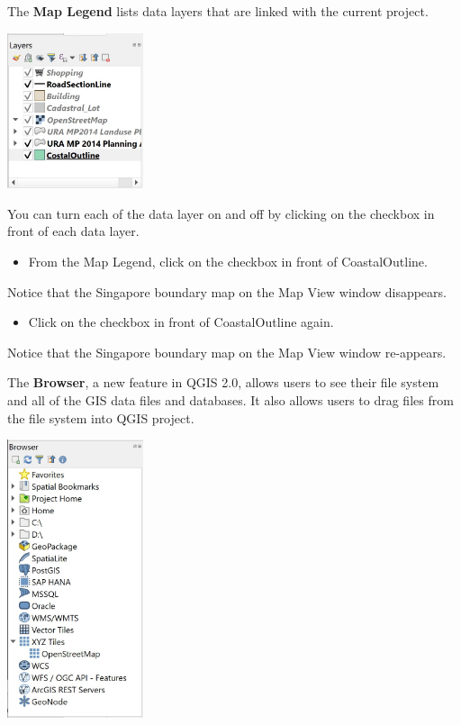 \documentclass[
  letterpaper,
  DIV=11,
  numbers=noendperiod]{scrreprt}
\providecommand{\tightlist}{%
  \setlength{\itemsep}{0pt}\setlength{\parskip}{0pt}}\usepackage{longtable,booktabs,array}
\begin{document}
The \textbf{Map Legend} lists data layers that are linked with the
current project.

\includegraphics[width=0.3\textwidth,height=\textheight]{./img/image1-10.jpg}

You can turn each of the data layer on and off by clicking on the
checkbox in front of each data layer.

\begin{itemize}
\tightlist
\item
  From the Map Legend, click on the checkbox in front of CoastalOutline.
\end{itemize}

Notice that the Singapore boundary map on the Map View window
disappears.

\begin{itemize}
\tightlist
\item
  Click on the checkbox in front of CoastalOutline again.
\end{itemize}

Notice that the Singapore boundary map on the Map View window
re-appears.

The \textbf{Browser}, a new feature in QGIS 2.0, allows users to see
their file system and all of the GIS data files and databases. It also
allows users to drag files from the file system into QGIS project.

\includegraphics[width=0.3\textwidth,height=\textheight]{./img/image1-11.jpg}
\end{document}
